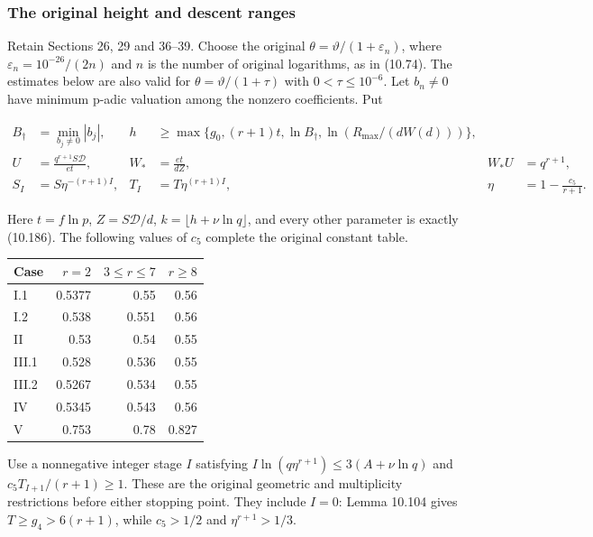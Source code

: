 \documentclass[
  11pt,
  a4paper,
]{article}
\newcounter{none} %
\begin{document}
\subsubsection{The original height and descent
ranges}\label{the-original-height-and-descent-ranges}

Retain Sections 26, 29 and 36--39. Choose the original
\(\theta=\vartheta/(1+\varepsilon_n)\), where
\(\varepsilon_n=10^{-26}/(2n)\) and \(n\) is the number of original
logarithms, as in (10.74). The estimates below are also valid for
\(\theta=\vartheta/(1+\tau)\) with \(0<\tau\le10^{-6}\). Let \(b_n\ne0\)
have minimum p-adic valuation among the nonzero coefficients. Put

\[
\begin{aligned}
B_{\dagger}&=\min_{b_j\ne0}|b_j|,&
h&\ge\max\{g_0,(r+1)t,\ln B_{\dagger},\ln(R_{\max}/(dW(d)))\},\\
U&=\frac{q^{r+1}S\mathcal D}{et},&
W_*&=\frac{et}{dZ},&W_*U&=q^{r+1},\\
S_I&=S\eta^{-(r+1)I},&T_I&=T\eta^{(r+1)I},&
\eta&=1-\frac{c_5}{r+1}.
\end{aligned}
\tag{10.323}
\]

Here \(t=f\ln p\), \(Z=S\mathcal D/d\), \(k=\lfloor h+\nu\ln q\rfloor\),
and every other parameter is exactly (10.186). The following values of
\(c_5\) complete the original constant table.

{\def\LTcaptype{none} %
\begin{longtable}[]{@{}lrrr@{}}
\toprule\noalign{}
Case & \(r=2\) & \(3\le r\le7\) & \(r\ge8\) \\
\midrule\noalign{}
\endhead
\bottomrule\noalign{}
\endlastfoot
I.1 & 0.5377 & 0.55 & 0.56 \\
I.2 & 0.538 & 0.551 & 0.56 \\
II & 0.53 & 0.54 & 0.55 \\
III.1 & 0.528 & 0.536 & 0.55 \\
III.2 & 0.5267 & 0.534 & 0.55 \\
IV & 0.5345 & 0.543 & 0.56 \\
V & 0.753 & 0.78 & 0.827 \\
\end{longtable}
}

Use a nonnegative integer stage \(I\) satisfying
\(I\ln(q\eta^{r+1})\le3(A+\nu\ln q)\) and \(c_5T_{I+1}/(r+1)\ge1\).
These are the original geometric and multiplicity restrictions before
either stopping point. They include \(I=0\): Lemma 10.104 gives
\(T\ge g_4>6(r+1)\), while \(c_5>1/2\) and \(\eta^{r+1}>1/3\).
\end{document}
